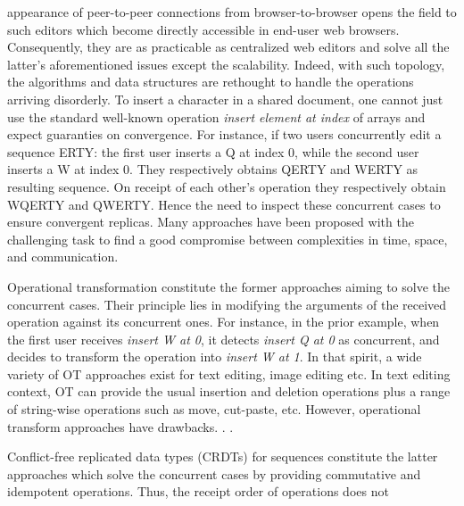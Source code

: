 \begin{asparadesc}
  appearance of peer-to-peer connections from browser-to-browser opens the field
  to such editors which become directly accessible in end-user web
  browsers. Consequently, they are as practicable as centralized web editors and
  solve all the latter's aforementioned issues except the scalability. Indeed,
  with such topology, the algorithms and data structures are rethought to handle
  the operations arriving disorderly.  To insert a character in a shared
  document, one cannot just use the standard well-known operation \emph{insert
    element at index} of arrays and expect guaranties on convergence. For
  instance, if two users concurrently edit a sequence ERTY: the first user
  inserts a Q at index 0, while the second user inserts a W at index 0. They
  respectively obtains QERTY and WERTY as resulting sequence. On receipt of each
  other's operation they respectively obtain WQERTY and QWERTY. Hence the need
  to inspect these concurrent cases to ensure convergent replicas.  Many
  approaches have been proposed with the challenging task to find a good
  compromise between complexities in time, space, and communication.
\item [Operational transformation] constitute the former approaches aiming to
  solve the concurrent cases. Their principle lies in modifying the arguments of
  the received operation against its concurrent ones. For instance, in the prior
  example, when the first user receives \emph{insert W at 0}, it detects
  \emph{insert Q at 0} as concurrent, and decides to transform the operation
  into \emph{insert W at 1}.  In that spirit, a wide variety of OT approaches
  exist for text editing, image editing etc. In text editing context, OT can
  provide the usual insertion and deletion operations plus a range of
  string-wise operations such as move, cut-paste, etc. However, operational
  transform approaches have drawbacks. . .
\item [Conflict-free replicated data types] (CRDTs) for sequences constitute the
  latter approaches which solve the concurrent cases by providing commutative
  and idempotent operations. Thus, the receipt order of operations does not

\end{asparadesc}
